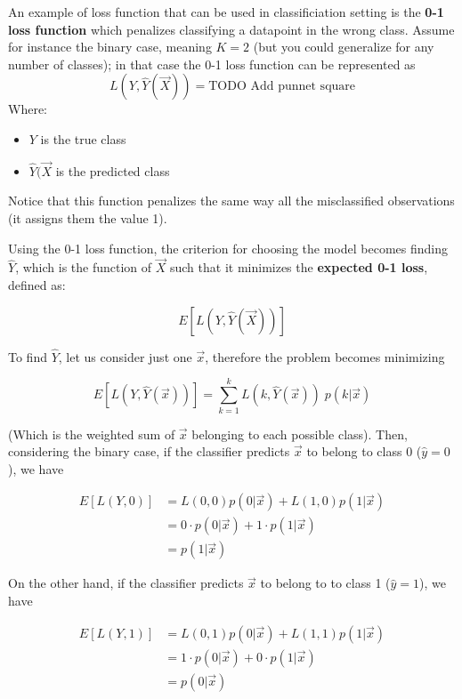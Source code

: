     An example of loss function that can be used in classificiation setting is the \textbf{0-1 loss function} which penalizes classifying a datapoint in the wrong class. Assume for instance the binary case, meaning $K = 2$ (but you could generalize for any number of classes); in that case the 0-1 loss function can be represented as
    $$ 
    L(Y, \hat{Y}(\vec{X})) = \text{TODO Add punnet square}
    $$
    Where:
    \begin{itemize}
      \item $Y$ is the true class
      \item $\hat{Y}(\vec{X}$ is the predicted class
    \end{itemize}
    Notice that this function penalizes the same way all the misclassified observations (it assigns them the value 1).  
    
    Using the 0-1 loss function, the criterion for choosing the model becomes finding $\hat{Y}$, which is the function of $\vec{X}$ such that it minimizes the \textbf{expected 0-1 loss}, defined as:

    $$ E[L(Y, \hat{Y}(\vec{X}))]$$

    To find $\hat{Y}$, let us consider just one $\vec{x}$, therefore the problem becomes minimizing 

    $$E[L(Y, \hat{Y}(\vec{x}))] = \sum_{k=1}^k L(k, \hat{Y}(\vec{x})) \; p(k|\vec{x})$$

    (Which is the weighted sum of $\vec{x}$ belonging to each possible class).
    Then, considering the binary case, if the classifier predicts $\vec{x}$ to belong to class 0 ($\hat{y} = 0$), we have 

    \begin{align*}
      E[L(Y,0)] & = L(0,0)p(0|\vec{x}) + L(1, 0)p(1|\vec{x}) \\
                & = 0 \cdot p(0|\vec{x}) + 1 \cdot p(1|\vec{x}) \\
                & = p(1|\vec{x})
    \end{align*}

    On the other hand, if the classifier predicts $\vec{x}$ to belong to to class 1 ($\hat{y} = 1$), we have

    \begin{align*}
      E[L(Y,1)] & = L(0,1)p(0|\vec{x}) + L(1, 1)p(1|\vec{x}) \\
                & = 1 \cdot p(0|\vec{x}) + 0 \cdot p(1|\vec{x}) \\
                & = p(0|\vec{x})
    \end{align*}

